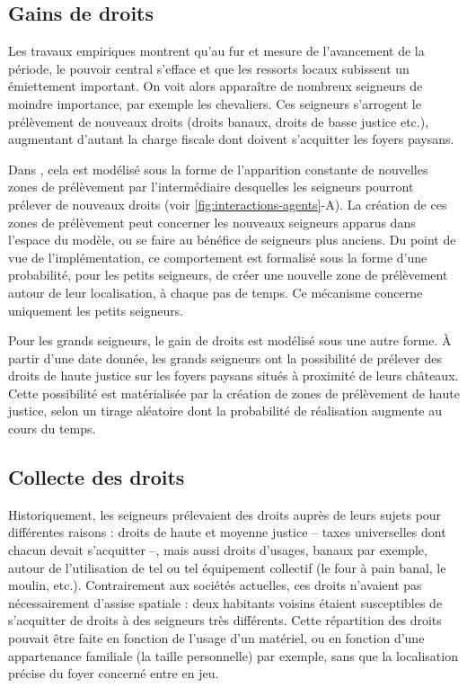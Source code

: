 \subsection{Gains de droits}

Les travaux empiriques montrent qu'au fur et mesure de l'avancement de la période, le pouvoir central s'efface et que les ressorts locaux subissent un émiettement important.
On voit alors apparaître de nombreux seigneurs de moindre importance, par exemple les chevaliers.
Ces seigneurs s'arrogent le prélèvement de nouveaux droits (droits banaux, droits de basse justice etc.), augmentant d'autant la charge fiscale dont doivent s'acquitter les foyers paysans.


\begin{tcolorbox}[breakable,left=0pt,right=0pt,top=0pt,bottom=0pt,
	colback=gray!15,colframe=gray!15,width=\dimexpr\textwidth\relax, 
	enlarge left by=0mm, boxsep=5pt,arc=0pt,outer arc=0pt]
Dans \simfeodal{}, cela est modélisé sous la forme de l'apparition constante de nouvelles zones de prélèvement par l'intermédiaire desquelles les seigneurs pourront prélever de nouveaux droits (voir \cref{fig:interactions-agents}-A).
La création de ces zones de prélèvement peut concerner les nouveaux seigneurs apparus dans l'espace du modèle, ou se faire au bénéfice de seigneurs plus anciens.
Du point de vue de l'implémentation, ce comportement est formalisé sous la forme d'une probabilité, pour les petits seigneurs, de créer une nouvelle zone de prélèvement autour de leur localisation, à chaque pas de temps.
Ce mécanisme concerne uniquement les petits seigneurs.

\medskip
Pour les grands seigneurs, le gain de droits est modélisé sous une autre forme.
À partir d'une date donnée, les grands seigneurs ont la possibilité de prélever des droits de haute justice sur les foyers paysans situés à proximité de leurs châteaux.
Cette possibilité est matérialisée par la création de zones de prélèvement de haute justice, selon un tirage aléatoire dont la probabilité de réalisation augmente au cours du temps.
\end{tcolorbox}

\subsection{Collecte des droits}

Historiquement, les seigneurs prélevaient des droits auprès de leurs sujets pour différentes raisons : droits de haute et moyenne justice -- taxes universelles dont chacun devait s'acquitter --, mais aussi droits d'usages, banaux par exemple, autour de l'utilisation de tel ou tel équipement collectif (le four à pain banal, le moulin, etc.).
Contrairement aux sociétés actuelles, ces droits n'avaient pas nécessairement d'assise spatiale : deux habitants voisins étaient susceptibles de s'acquitter de droits à des seigneurs très différents.
Cette répartition des droits pouvait être faite en fonction de l'usage d'un matériel, ou en fonction d'une appartenance familiale (la \og taille\fg{} personnelle) par exemple, sans que la localisation précise du foyer concerné entre en jeu.

